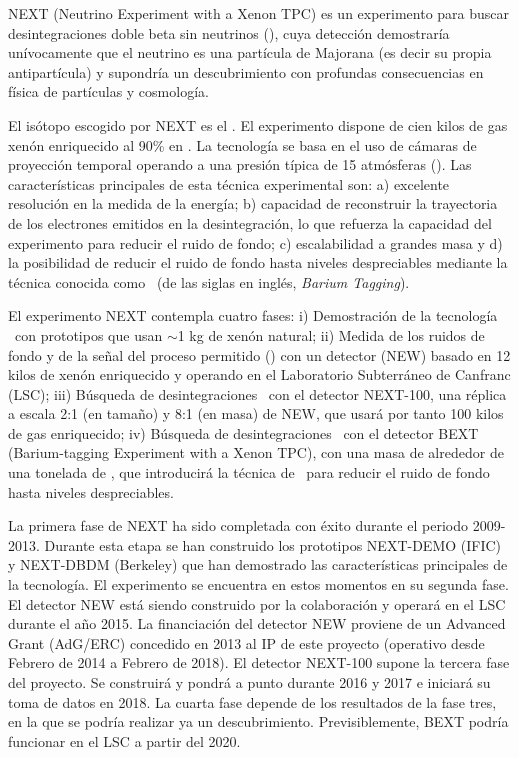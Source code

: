 
NEXT (Neutrino Experiment with a Xenon TPC) es un experimento para buscar desintegraciones doble beta sin neutrinos (\bbonu), cuya detección demostraría unívocamente que el neutrino es una partícula de Majorana (es decir su propia antipartícula) y supondría un descubrimiento con profundas consecuencias en física de partículas y cosmología. 

 El isótopo escogido por NEXT es el \XE. El experimento dispone de cien kilos de gas xenón enriquecido al 90\% en \XE. La tecnología se basa en el uso de cámaras de proyección temporal operando a una presión típica de 15 atmósferas (\HPXE). Las características principales de esta técnica experimental son: a) excelente resolución en la medida de la energía; b) capacidad de reconstruir la trayectoria de los electrones emitidos en la desintegración, lo que refuerza la capacidad del experimento para reducir el ruido de fondo; c) escalabilidad a grandes masa y d) la posibilidad de reducir el ruido de fondo hasta niveles despreciables mediante la técnica conocida como \BATA\ (de las siglas en inglés, {\em Barium Tagging}).

 El experimento NEXT contempla cuatro fases: i) Demostración de la tecnología \HPXE\ con prototipos que usan $\sim$1 kg de xenón natural; ii) Medida de los ruidos de fondo y de la señal del proceso permitido (\bbtnu) con un detector (NEW) basado en 12 kilos de xenón enriquecido y operando en el Laboratorio Subterráneo de Canfranc (LSC); iii) Búsqueda de desintegraciones \bbonu\ con el detector NEXT-100, una réplica a escala 2:1 (en tamaño) y 8:1 (en masa) de NEW, que usará por tanto 100 kilos de gas enriquecido; iv) Búsqueda de desintegraciones \bbonu\ con el detector BEXT (Barium-tagging Experiment with a Xenon TPC), con una masa de alrededor de una tonelada de \XE, que introducirá la técnica de \BATA\ para reducir el ruido de fondo hasta niveles despreciables. 

La primera fase de NEXT ha sido completada con éxito durante el periodo 2009-2013. Durante esta etapa se han construido los prototipos NEXT-DEMO (IFIC) y NEXT-DBDM (Berkeley) que han demostrado las características principales de la tecnología. El experimento se encuentra en estos momentos en su segunda fase. El detector NEW está siendo construido por la colaboración y operará en el LSC durante el año 2015. La financiación del detector NEW proviene de un Advanced Grant (AdG/ERC) concedido en 2013 al IP de este proyecto (operativo desde Febrero de 2014 a Febrero de 2018). El detector NEXT-100 supone la tercera fase del proyecto. Se construirá y pondrá a punto durante 2016 y 2017 e iniciará su toma de datos en 2018. La cuarta fase depende de los resultados de la fase tres, en la que se podría realizar ya un descubrimiento. Previsiblemente, BEXT podría funcionar en el LSC a partir del 2020. 

